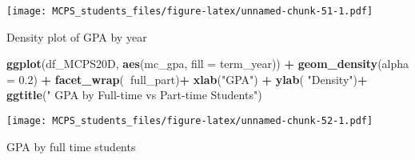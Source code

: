 \documentclass[]{article}
\newenvironment{Shaded}{\begin{snugshade}}{\end{snugshade}}
\newcommand{\DataTypeTok}[1]{\textcolor[rgb]{0.13,0.29,0.53}{#1}}
\newcommand{\FloatTok}[1]{\textcolor[rgb]{0.00,0.00,0.81}{#1}}
\newcommand{\KeywordTok}[1]{\textcolor[rgb]{0.13,0.29,0.53}{\textbf{#1}}}
\newcommand{\NormalTok}[1]{#1}
\newcommand{\OperatorTok}[1]{\textcolor[rgb]{0.81,0.36,0.00}{\textbf{#1}}}
\newcommand{\StringTok}[1]{\textcolor[rgb]{0.31,0.60,0.02}{#1}}
\begin{document}
\texttt{[image: MCPS\_students\_files/figure-latex/unnamed-chunk-51-1.pdf]}

Density plot of GPA by year

\begin{Shaded}
\begin{Highlighting}[]
\KeywordTok{ggplot}\NormalTok{(df_MCPS20D, }\KeywordTok{aes}\NormalTok{(mc_gpa, }\DataTypeTok{fill =}\NormalTok{ term_year)) }\OperatorTok{+}\StringTok{ }\KeywordTok{geom_density}\NormalTok{(}\DataTypeTok{alpha =} \FloatTok{0.2}\NormalTok{) }\OperatorTok{+}
\StringTok{  }\KeywordTok{facet_wrap}\NormalTok{(}\OperatorTok{~}\NormalTok{full_part)}\OperatorTok{+}
\StringTok{  }\KeywordTok{xlab}\NormalTok{(}\StringTok{"GPA"}\NormalTok{) }\OperatorTok{+}
\StringTok{  }\KeywordTok{ylab}\NormalTok{( }\StringTok{"Density"}\NormalTok{)}\OperatorTok{+}
\StringTok{  }\KeywordTok{ggtitle}\NormalTok{(}\StringTok{" GPA by Full-time vs Part-time Students"}\NormalTok{)}
\end{Highlighting}
\end{Shaded}

\texttt{[image: MCPS\_students\_files/figure-latex/unnamed-chunk-52-1.pdf]}

GPA by full time students

\begin{Shaded}
\end{Shaded}
\end{document}
